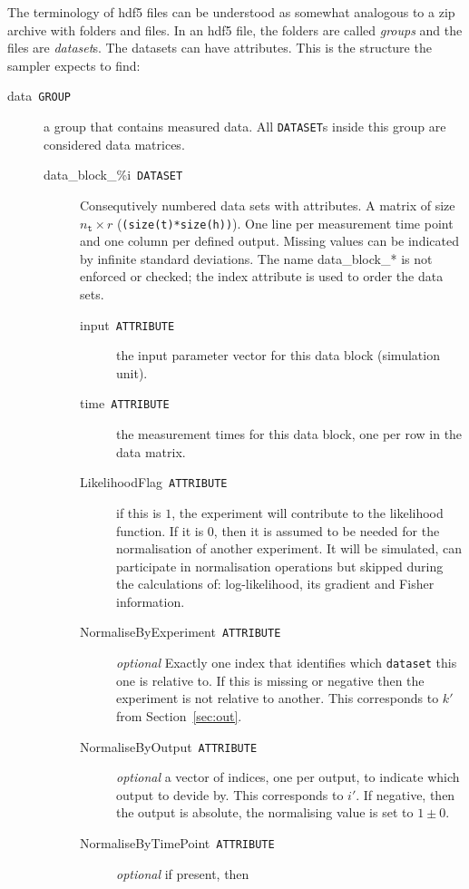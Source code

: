 \documentclass[utf8,english,DIV=12,12pt]{scrartcl}
\newcommand{\standard}[1]{\textsf{#1}}
\begin{document}
The terminology of \standard{hdf5} files can be understood as somewhat
analogous to a zip archive with folders and files. In an \standard{hdf5}
file, the folders are called \emph{groups} and the files are
\emph{dataset}s. The datasets can have attributes. This is the
structure the sampler expects to find:
\begin{description}
\item[data~\texttt{GROUP}] a group that contains measured data. All
  \texttt{DATASET}s inside this group are considered data matrices.
  \begin{description}
  \item[data\_block\_\%i~\texttt{DATASET}] Consequtively numbered data
    sets with attributes. A matrix of size $n_\texttt{t}\times r$
    (\texttt{(size(t)*size(h))}). One line per measurement time point
    and one column per defined output. Missing values can be indicated
    by infinite standard deviations. The name \textsf{data\_block\_*}
    is not enforced or checked; the \textsf{index} attribute is used
    to order the data sets.
    \begin{description}
    \item[input~\texttt{ATTRIBUTE}] the input parameter vector for this data block
      (simulation unit).
    \item[time~\texttt{ATTRIBUTE}] the measurement times for this data
      block, one per row in the data matrix.
    \item[LikelihoodFlag~\texttt{ATTRIBUTE}] if this is $1$, the
      experiment will contribute to the likelihood function. If it is
      $0$, then it is assumed to be needed for the normalisation of
      another experiment. It will be simulated, can participate in
      normalisation operations but skipped during the calculations of:
      log-likelihood, its gradient and Fisher information.
    \item[NormaliseByExperiment~\texttt{ATTRIBUTE}] \emph{optional}
      Exactly one index that identifies which \texttt{dataset} this
      one is relative to. If this is missing or negative then the
      experiment is not relative to another. This corresponds to $k'$
      from Section~\ref{sec:out}.
    \item[NormaliseByOutput~\texttt{ATTRIBUTE}] \emph{optional} a vector of indices,
      one per output, to indicate which output to devide by. This
      corresponds to $i'$. If negative, then the output is absolute,
      the normalising value is set to $1\pm 0$.
    \item[NormaliseByTimePoint~\texttt{ATTRIBUTE}] \emph{optional} if present, then

\end{description}
\end{description}
\end{description}
\end{document}
